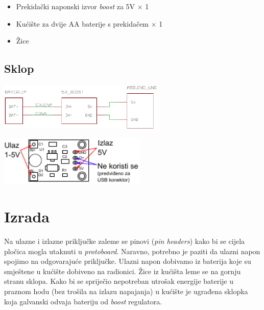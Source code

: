 \documentclass[times, utf8, zavrsni, numeric, sort]{fer}
\begin{document}
\begin{itemize}
	\setlength{\itemsep}{0pt}
	\setlength{\parskip}{0pt}
	
	\item Prekidački naponski izvor \textit{boost} za 5V $\times$ 1
	\item Kućište za dvije AA baterije s prekidačem $\times$ 1
	\item Žice
\end{itemize}

\subsection{Sklop}

\begin{minipage}{1.0\textwidth}
	\centering
	\includegraphics[width=8cm]{./Sklopovi/5V boost/sklop.pdf}
	\label{fig:5Vboost-sch}
\end{minipage}

\begin{minipage}{1.0\textwidth}
	\centering
	\includegraphics[width=7cm]{./Sklopovi/5V boost/pinout.pdf}
	\label{fig:5Vboost-pinout}
\end{minipage}

\section{Izrada}
Na ulazne i izlazne priključke zaleme se pinovi (\textit{pin headers}) kako bi se cijela pločica mogla utaknuti u \textit{protoboard}. Naravno, potrebno je paziti da ulazni napon spojimo na odgovarajuće priključke. Ulazni napon dobivamo iz baterija koje su smještene u kućište dobiveno na radionici. Žice iz kućišta leme se na gornju stranu sklopa. Kako bi se spriječio nepotreban utrošak energije baterije u praznom hodu (bez trošila na izlazu napajanja) u kućište je ugrađena sklopka koja galvanski odvaja bateriju od \textit{boost} regulatora.
\end{document}
